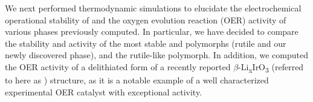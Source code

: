%



%
%
We next performed  thermodynamic simulations to elucidate the electrochemical operational stability of \IrOx and the oxygen evolution reaction (OER) activity of various \IrOthree phases previously computed.
%
In particular, we have decided to compare the stability and activity of the most stable \IrOtwo and \IrOthree polymorphs (rutile and our newly discovered \aIrOthree phase), and the rutile-like \IrOthree polymorph.
%
In addition, we computed the OER activity of a delithiated form of a recently reported $\beta$-Li\textsubscript{x}IrO\textsubscript{3} (referred to here as \bIrOthree) structure, as it is a notable example of a well characterized experimental \IrOthree OER catalyst with exceptional activity.~\cite{Pearce2017,Pearce2019}


